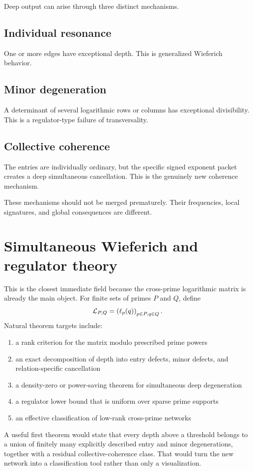 Deep output can arise through three distinct mechanisms.

\subsection{Individual resonance}
One or more edges have exceptional depth. This is generalized Wieferich behavior.

\subsection{Minor degeneration}
A determinant of several logarithmic rows or columns has exceptional divisibility. This is a regulator-type failure of transversality.

\subsection{Collective coherence}
The entries are individually ordinary, but the specific signed exponent packet creates a deep simultaneous cancellation. This is the genuinely new coherence mechanism.

These mechanisms should not be merged prematurely. Their frequencies, local signatures, and global consequences are different.

\section{Simultaneous Wieferich and regulator theory}
This is the closest immediate field because the cross-prime logarithmic matrix is already the main object. For finite sets of primes $P$ and $Q$, define
\[
\mathcal L_{P,Q}
=
\left(
\ell_p(q)
\right)_{p\in P,q\in Q}.
\]
Natural theorem targets include:
\begin{enumerate}[leftmargin=1.5em]
\item a rank criterion for the matrix modulo prescribed prime powers
\item an exact decomposition of depth into entry defects, minor defects, and relation-specific cancellation
\item a density-zero or power-saving theorem for simultaneous deep degeneration
\item a regulator lower bound that is uniform over sparse prime supports
\item an effective classification of low-rank cross-prime networks
\end{enumerate}

A useful first theorem would state that every depth above a threshold belongs to a union of finitely many explicitly described entry and minor degenerations, together with a residual collective-coherence class. That would turn the new network into a classification tool rather than only a visualization.

